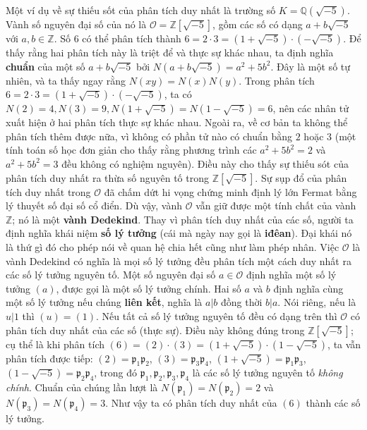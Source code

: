\begin{multicols}{2}
	Một ví dụ về sự thiếu sốt của phân tích duy nhất là trường số $K = \mathbb{Q}(\sqrt{-5})$. Vành số nguyên đại số của nó là $\mathcal{O} = \mathbb{Z}[\sqrt{-5}]$, gồm các số có dạng $a+b\sqrt{-5}$ với $a,b \in \mathbb{Z}$. Số $6$ có thể phân tích thành $6 = 2 \cdot 3 = (1+\sqrt{-5}) \cdot (-\sqrt{-5})$. Để thấy rằng hai phân tích này là triệt để và thực sự khác nhau, ta định nghĩa {\bf\color{duongvaotoanhoc} chuẩn} của một số $a+b\sqrt{-5}$ bởi $N(a+b\sqrt{-5}) = a^2 + 5b^2$. Đây là một số tự nhiên, và ta thấy ngay rằng $N(xy) = N(x)N(y)$. Trong phân tích $6 = 2 \cdot 3 = (1+\sqrt{-5}) \cdot (-\sqrt{-5})$, ta có $N(2) = 4, N(3) = 9, N(1+\sqrt{-5}) = N(1-\sqrt{-5}) = 6$, nên các nhân tử xuất hiện ở hai phân tích thực sự khác nhau.  Ngoài ra, về cơ bản ta không thể phân tích thêm được nữa, vì không có phần tử nào có chuẩn bằng $2$ hoặc $3$ (một tính toán số học đơn giản cho thấy rằng phương trình các $a^2 + 5b^2 = 2$ và $a^2 + 5b^2 = 3$ đều không có nghiệm nguyên). Điều này cho thấy sự thiếu sót của phân tích duy nhất ra thừa số nguyên tố trong $\mathbb{Z}[\sqrt{-5}]$.
	\vskip 0.1cm
	Sự sụp đổ của phân tích duy nhất trong $\mathcal{O}$ đã chấm dứt hi vọng chứng minh định lý lớn Fermat bằng lý thuyết số đại số cổ điển. Dù vậy, vành $\mathcal{O}$ vẫn giữ được một tính chất của vành $\mathbb{Z}$; nó là một {\bf\color{duongvaotoanhoc} vành Dedekind}. Thay vì phân tích duy nhất của các số, người ta định nghĩa khái niệm {\bf\color{duongvaotoanhoc} số lý tưởng} (cái mà ngày nay gọi là {\bf\color{duongvaotoanhoc} iđêan}). Đại khái nó là thứ gì đó cho phép nói về quan hệ chia hết cũng như làm phép nhân. Việc $\mathcal{O}$ là vành Dedekind có nghĩa là mọi số lý tưởng đều phân tích một cách duy nhất ra các số lý tưởng nguyên tố. Một số nguyên đại số $a \in \mathcal{O}$ định nghĩa một số lý tưởng $(a)$, được gọi là một số lý tưởng chính. Hai số $a$ và $b$ định nghĩa cùng một số lý tưởng nếu chúng {\bf\color{duongvaotoanhoc} liên kết}, nghĩa là $a|b$ đồng thời $b|a$. Nói riêng, nếu là $u|1$ thì $(u) = (1)$. Nếu tất cả số lý tưởng nguyên tố đều có dạng trên thì $\mathcal{O}$ có phân tích duy nhất của các số (thực sự). Điều này không đúng trong $\mathbb{Z}[\sqrt{-5}]$; cụ thể là khi phân tích $(6) = (2) \cdot (3) = (1 + \sqrt{-5}) \cdot (1 - \sqrt{-5})$, ta vẫn phân tích được tiếp: $(2) = \mathfrak{p}_1\mathfrak{p}_2$, $(3) = \mathfrak{p}_3\mathfrak{p}_4$, $(1 + \sqrt{-5}) = \mathfrak{p}_1\mathfrak{p}_3$, $(1 - \sqrt{-5}) = \mathfrak{p}_2\mathfrak{p}_4$, trong đó $\mathfrak{p}_1, \mathfrak{p}_2, \mathfrak{p}_3, \mathfrak{p}_4$ là các số lý tưởng nguyên tố {\it không chính}. Chuẩn của chúng lần lượt là $N(\mathfrak{p}_1) = N(\mathfrak{p}_2) = 2$ và $N(\mathfrak{p}_3) = N(\mathfrak{p}_4) = 3$. Như vậy ta có phân tích duy nhất của $(6)$ thành các số lý tưởng.

\end{multicols}
